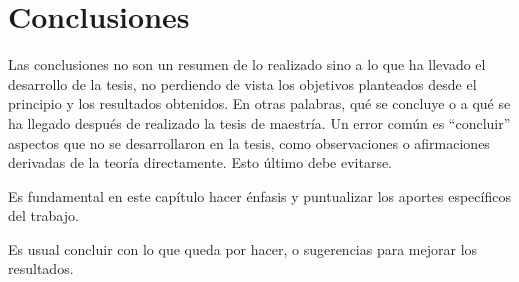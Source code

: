 \chapter{Conclusiones}

Las conclusiones no son un resumen de lo realizado sino a lo que ha llevado el
desarrollo de la tesis, no perdiendo de vista los objetivos planteados desde
el principio y los resultados obtenidos.  En otras palabras, qué se concluye o
a qué se ha llegado después de realizado la tesis de maestría.  Un error
común es ``concluir'' aspectos que no se desarrollaron en la tesis, como
observaciones o afirmaciones derivadas de la teoría directamente.  Esto último
debe evitarse.

Es fundamental en este capítulo hacer énfasis y puntualizar los
aportes específicos del trabajo.

Es usual concluir con lo que queda por hacer, o sugerencias para mejorar los
resultados.


